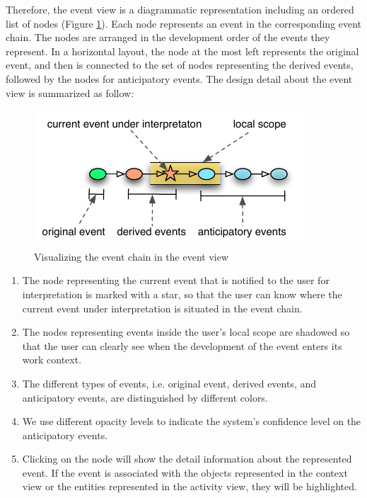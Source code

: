 Therefore, the event view is a diagrammatic representation including an ordered list of nodes (Figure \ref{fig:event_chain}). Each node represents an event in the corresponding event chain. The nodes are arranged in the development order of the events they represent. In a horizontal layout, the node at the most left represents the original event, and then is connected to the set of nodes representing the derived events, followed by the nodes for anticipatory events. The design detail about the event view is summarized as follow:

\begin{figure}[htbp] %
	\centering
	\includegraphics{event_chain.pdf} 
	\caption{Visualizing the event chain in the event view}
	\label{fig:event_chain}
\end{figure}

\begin{enumerate}
	\item The node representing the current event that is notified to the user for interpretation is marked with a star, so that the user can know where the current event under interpretation is situated in the event chain.
	\item The nodes representing events inside the user's local scope are shadowed so that the user can clearly see when the development of the event enters its work context.
	\item The different types of events, i.e. original event, derived events, and anticipatory events, are distinguished by different colors.
	\item We use different opacity levels to indicate the system's confidence level on the anticipatory events.
	\item Clicking on the node will show the detail information about the represented event. If the event is associated with the objects represented in the context view or the entities represented in the activity view, they will be highlighted.
\end{enumerate}
 
